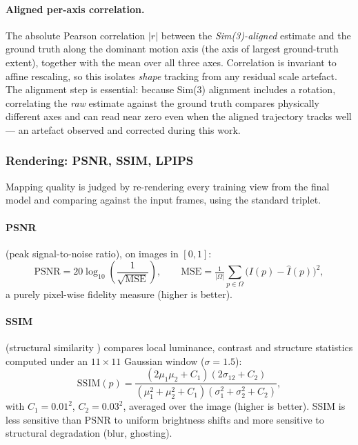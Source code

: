 \paragraph{Aligned per-axis correlation.} The absolute Pearson correlation
$|r|$ between the \emph{Sim(3)-aligned} estimate and the ground truth along the
dominant motion axis (the axis of largest ground-truth extent), together with the
mean over all three axes. Correlation is invariant to affine rescaling, so this
isolates \emph{shape} tracking from any residual scale artefact. The alignment
step is essential: because Sim(3) alignment includes a rotation, correlating the
\emph{raw} estimate against the ground truth compares physically different axes
and can read near zero even when the aligned trajectory tracks well --- an
artefact observed and corrected during this work.

\subsubsection{Rendering: PSNR, SSIM, LPIPS}
\label{sec:eval_render}

Mapping quality is judged by re-rendering every training view from the final model
and comparing against the input frames, using the standard triplet.

\paragraph{PSNR} (peak signal-to-noise ratio), on images in $[0,1]$:
\begin{equation}
  \mathrm{PSNR} = 20 \log_{10}\!\left( \frac{1}{\sqrt{\mathrm{MSE}}} \right),
  \qquad
  \mathrm{MSE} = \tfrac{1}{|\Omega|}\textstyle\sum_{p \in \Omega}
  \bigl( I(p) - \hat{I}(p) \bigr)^2 ,
\end{equation}
a purely pixel-wise fidelity measure (higher is better).

\paragraph{SSIM} (structural similarity \cite{wang2004ssim}) compares local
luminance, contrast and structure statistics computed under an $11{\times}11$
Gaussian window ($\sigma{=}1.5$):
\begin{equation}
  \mathrm{SSIM}(p) =
  \frac{(2\mu_1\mu_2 + C_1)(2\sigma_{12} + C_2)}
       {(\mu_1^2 + \mu_2^2 + C_1)(\sigma_1^2 + \sigma_2^2 + C_2)},
\end{equation}
with $C_1 = 0.01^2$, $C_2 = 0.03^2$, averaged over the image (higher is better).
SSIM is less sensitive than PSNR to uniform brightness shifts and more sensitive
to structural degradation (blur, ghosting).

